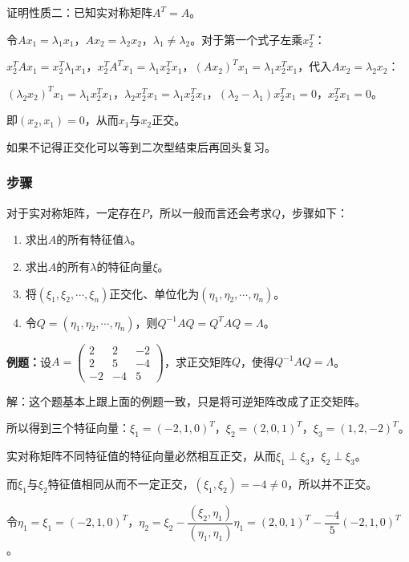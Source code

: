 \documentclass[UTF8, 12pt]{ctexart}
\begin{document}
证明性质二：已知实对称矩阵$A^T=A$。

令$Ax_1=\lambda_1x_1$，$Ax_2=\lambda_2x_2$，$\lambda_1\neq\lambda_2$。对于第一个式子左乘$x_2^T$：

$x_2^TAx_1=x_2^T\lambda_1x_1$，$x_2^TA^Tx_1=\lambda_1x_2^Tx_1$，$(Ax_2)^Tx_1=\lambda_1x_2^Tx_1$，代入$Ax_2=\lambda_2x_2$：

$(\lambda_2x_2)^Tx_1=\lambda_1x_2^Tx_1$，$\lambda_2x_2^Tx_1=\lambda_1x_2^Tx_1$，$(\lambda_2-\lambda_1)x_2^Tx_1=0$，$x_2^Tx_1=0$。

即$(x_2,x_1)=0$，从而$x_1$与$x_2$正交。

如果不记得正交化可以等到二次型结束后再回头复习。

\subsubsection{步骤}

对于实对称矩阵，一定存在$P$，所以一般而言还会考求$Q$，步骤如下：

\begin{enumerate}
    \item 求出$A$的所有特征值$\lambda$。
    \item 求出$A$的所有$\lambda$的特征向量$\xi$。
    \item 将$(\xi_1,\xi_2,\cdots,\xi_n)$正交化、单位化为$(\eta_1,\eta_2,\cdots,\eta_n)$。
    \item 令$Q=(\eta_1,\eta_2,\cdots,\eta_n)$，则$Q^{-1}AQ=Q^TAQ=\Lambda$。
\end{enumerate}

\textbf{例题：}设$A=\left(\begin{array}{ccc}
    2 & 2 & -2 \\
    2 & 5 & -4 \\
    -2 & -4 & 5
\end{array}\right)$，求正交矩阵$Q$，使得$Q^{-1}AQ=\Lambda$。\medskip

解：这个题基本上跟上面的例题一致，只是将可逆矩阵改成了正交矩阵。

所以得到三个特征向量：$\xi_1=(-2,1,0)^T$，$\xi_2=(2,0,1)^T$，$\xi_3=(1,2,-2)^T$。

实对称矩阵不同特征值的特征向量必然相互正交，从而$\xi_1\perp\xi_3$，$\xi_2\perp\xi_3$。

而$\xi_1$与$\xi_2$特征值相同从而不一定正交，$(\xi_1,\xi_2)=-4\neq0$，所以并不正交。

令$\eta_1=\xi_1=(-2,1,0)^T$，$\eta_2=\xi_2-\dfrac{(\xi_2,\eta_1)}{(\eta_1,\eta_1)}\eta_1=(2,0,1)^T-\dfrac{-4}{5}(-2,1,0)^T$。
\end{document}
